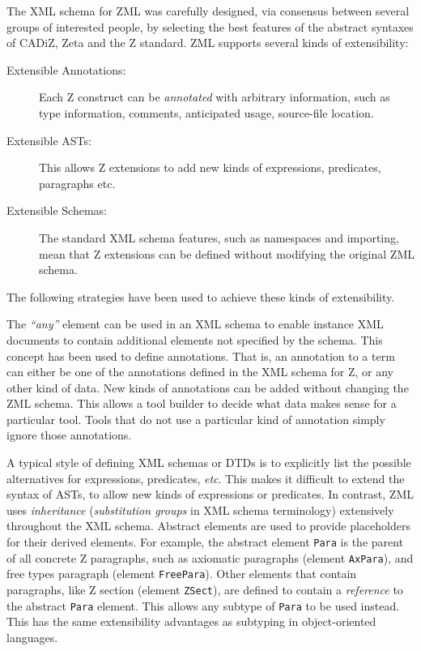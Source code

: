 \documentclass{llncs}
\newcommand{\Element}[1]{\texttt{#1}}
\begin{document}
  The XML schema for ZML was carefully designed, via consensus between
  several groups of interested people, by selecting the best features
  of the abstract syntaxes of CADiZ, Zeta and the Z standard.
  ZML supports several kinds of extensibility:
  \begin{description}
  \item[Extensible Annotations:] Each Z construct can be \emph{annotated}
    with arbitrary information, such as type information, comments,
    anticipated usage, source-file location.
  \item[Extensible ASTs:] This allows Z extensions to add new kinds
    of expressions, predicates, paragraphs etc.
  \item[Extensible Schemas:] The standard XML schema features, such as
    namespaces and importing, mean that Z extensions can be defined without
    modifying the original ZML schema.
  \end{description}
  The following strategies have been used to achieve these kinds
  of extensibility.

  The \textit{``any''} element can be used in an XML schema to enable
  instance XML documents to contain additional elements not specified
  by the schema.  This concept has been used to define annotations.
  That is, an annotation to a term can either be one of the
  annotations defined in the XML schema for Z, or any other kind of
  data.  New kinds of annotations can be added without changing the ZML
  schema.  This allows a tool builder to decide what data makes sense
  for a particular tool.  Tools that do not use a particular kind
  of annotation simply ignore those annotations.

  A typical style of defining XML schemas or DTDs is to explicitly
  list the possible alternatives for expressions, predicates, \textit{etc}.
  This makes it difficult to extend the syntax of ASTs, to allow new
  kinds of expressions or
  predicates.  In contrast, ZML uses \emph{inheritance}
  (\emph{substitution groups} in XML schema terminology) extensively
  throughout the XML schema.  Abstract elements are used to provide
  placeholders for their derived elements.  For example, the abstract
  element \Element{Para} is the parent of all concrete Z paragraphs,
  such as axiomatic paragraphs (element \Element{AxPara}), and free
  types paragraph (element \Element{FreePara}).  Other elements that
  contain paragraphs, like Z section (element \Element{ZSect}), are
  defined to contain a \emph{reference} to the abstract \Element{Para}
  element.  This allows any subtype of \Element{Para} to be used
  instead.  This has the same extensibility advantages as subtyping
  in object-oriented languages.
\end{document}
